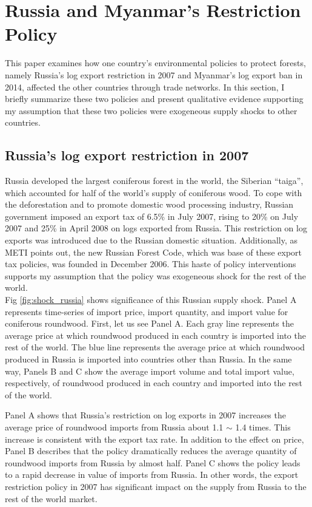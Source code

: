 \documentclass[a4paper,12pt]{article}
\begin{document}
\section{Russia and Myanmar's Restriction Policy}
This paper examines how one country's environmental policies to protect forests, namely Russia's log export restriction in 2007 and Myanmar's log export ban in 2014, affected the other countries through trade networks. In this section, I briefly summarize these two policies and present qualitative evidence supporting my assumption that these two policies were exogeneous supply shocks to other countries.

\subsection{Russia's log export restriction in 2007}
Russia developed the largest coniferous forest in the world, the Siberian ``taiga'', which accounted for half of the world's supply of coniferous wood.  To cope with the deforestation and to promote domestic wood processing industry, Russian government imposed an export tax of 6.5\% in July 2007, rising to 20\% on July 2007 and 25\% in April 2008 on logs exported from Russia. This restriction on log exports was introduced due to the Russian domestic situation. Additionally, as METI points out, the new Russian Forest Code, which was base of these export tax policies, was founded in December 2006. This haste of policy interventions supports my assumption that the policy was exogeneous shock for the rest of the world. \\

Fig \ref{fig:shock_russia} shows significance of this Russian supply shock. Panel A represents time-series of import price, import quantity, and import value for coniferous roundwood. First, let us see Panel A. Each gray line represents the average price at which roundwood produced in each country is imported into the rest of the world. The blue line represents the average price at which roundwood produced in Russia is imported into countries other than Russia. In the same way, Panels B and C show the average import volume and total import value, respectively, of roundwood produced in each country and imported into the rest of the world.

Panel A shows that Russia's restriction on log exports in 2007 increases the average price of roundwood imports from Russia about 1.1 $\sim$ 1.4 times. This increase is consistent with the export tax rate. In addition to the effect on price, Panel B describes that the policy dramatically reduces the average quantity of roundwood imports from Russia by almost half. Panel C shows the policy leads to a rapid decrease in value of imports from Russia. In other words, the export restriction policy in 2007 has significant impact on the supply from Russia to the rest of the world market. 
\end{document}

